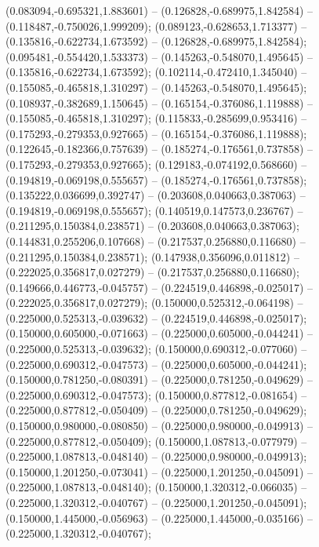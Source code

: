  (0.083094,-0.695321,1.883601) -- (0.126828,-0.689975,1.842584) -- (0.118487,-0.750026,1.999209);
 (0.089123,-0.628653,1.713377) -- (0.135816,-0.622734,1.673592) -- (0.126828,-0.689975,1.842584);
 (0.095481,-0.554420,1.533373) -- (0.145263,-0.548070,1.495645) -- (0.135816,-0.622734,1.673592);
 (0.102114,-0.472410,1.345040) -- (0.155085,-0.465818,1.310297) -- (0.145263,-0.548070,1.495645);
 (0.108937,-0.382689,1.150645) -- (0.165154,-0.376086,1.119888) -- (0.155085,-0.465818,1.310297);
 (0.115833,-0.285699,0.953416) -- (0.175293,-0.279353,0.927665) -- (0.165154,-0.376086,1.119888);
 (0.122645,-0.182366,0.757639) -- (0.185274,-0.176561,0.737858) -- (0.175293,-0.279353,0.927665);
 (0.129183,-0.074192,0.568660) -- (0.194819,-0.069198,0.555657) -- (0.185274,-0.176561,0.737858);
 (0.135222,0.036699,0.392747) -- (0.203608,0.040663,0.387063) -- (0.194819,-0.069198,0.555657);
 (0.140519,0.147573,0.236767) -- (0.211295,0.150384,0.238571) -- (0.203608,0.040663,0.387063);
 (0.144831,0.255206,0.107668) -- (0.217537,0.256880,0.116680) -- (0.211295,0.150384,0.238571);
 (0.147938,0.356096,0.011812) -- (0.222025,0.356817,0.027279) -- (0.217537,0.256880,0.116680);
 (0.149666,0.446773,-0.045757) -- (0.224519,0.446898,-0.025017) -- (0.222025,0.356817,0.027279);
 (0.150000,0.525312,-0.064198) -- (0.225000,0.525313,-0.039632) -- (0.224519,0.446898,-0.025017);
 (0.150000,0.605000,-0.071663) -- (0.225000,0.605000,-0.044241) -- (0.225000,0.525313,-0.039632);
 (0.150000,0.690312,-0.077060) -- (0.225000,0.690312,-0.047573) -- (0.225000,0.605000,-0.044241);
 (0.150000,0.781250,-0.080391) -- (0.225000,0.781250,-0.049629) -- (0.225000,0.690312,-0.047573);
 (0.150000,0.877812,-0.081654) -- (0.225000,0.877812,-0.050409) -- (0.225000,0.781250,-0.049629);
 (0.150000,0.980000,-0.080850) -- (0.225000,0.980000,-0.049913) -- (0.225000,0.877812,-0.050409);
 (0.150000,1.087813,-0.077979) -- (0.225000,1.087813,-0.048140) -- (0.225000,0.980000,-0.049913);
 (0.150000,1.201250,-0.073041) -- (0.225000,1.201250,-0.045091) -- (0.225000,1.087813,-0.048140);
 (0.150000,1.320312,-0.066035) -- (0.225000,1.320312,-0.040767) -- (0.225000,1.201250,-0.045091);
 (0.150000,1.445000,-0.056963) -- (0.225000,1.445000,-0.035166) -- (0.225000,1.320312,-0.040767);
